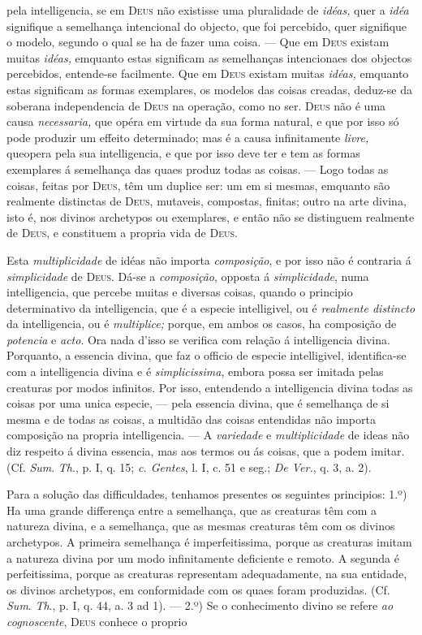 pela intelligencia, se em \textsc{Deus} não existisse uma pluralidade de \emph{idéas,} quer a \emph{idéa} signifique a semelhança intencional do objecto, que foi percebido, quer signifique o modelo, segundo o qual se ha de fazer uma coisa. --- Que em \textsc{Deus} existam muitas \emph{idéas,} emquanto estas significam as semelhanças intencionaes dos objectos percebidos, entende-se facilmente. Que em \textsc{Deus} existam muitas \emph{idéas,} emquanto estas significam as formas exemplares, os modelos das coisas creadas, deduz-se da soberana independencia de \textsc{Deus} na operação, como no ser. \textsc{Deus} não é uma causa \emph{necessaria,} que opéra em virtude da sua forma natural, e que por isso só pode produzir um effeito determinado; mas é a causa infinitamente \emph{livre,} queopera pela sua intelligencia, e que por isso deve ter e tem as formas exemplares á semelhança das quaes produz todas as coisas. --- Logo todas as coisas, feitas por \textsc{Deus}, têm um duplice ser: um em si mesmas, emquanto são realmente distinctas de \textsc{Deus}, mutaveis, compostas, finitas; outro na arte divina, isto é, nos divinos archetypos ou exemplares, e então não se distinguem realmente de \textsc{Deus}, e constituem a propria vida de \textsc{Deus}.\par Esta \emph{multiplicidade} de idéas não importa \emph{composição}, e por isso não é contraria á \emph{simplicidade} de \textsc{Deus}. Dá-se a \emph{composição}, opposta á \emph{simplicidade}, numa intelligencia, que percebe muitas e diversas coisas, quando o principio determinativo da intelligencia, que é a especie intelligivel, ou é \emph{realmente distincto} da intelligencia, ou é \emph{multiplice;} porque, em ambos os casos, ha composição de \emph{potencia} e \emph{acto}. Ora nada d'isso se verifica com relação á intelligencia divina. Porquanto, a essencia divina, que faz o officio de especie intelligivel, identifica-se com a intelligencia divina e é \emph{simplicissima}, embora possa ser imitada pelas creaturas por modos infinitos. Por isso, entendendo a intelligencia divina todas as coisas por uma unica especie, --- pela essencia divina, que é semelhança de si mesma e de todas as coisas, a multidão das coisas entendidas não importa composição na propria intelligencia. --- A \emph{variedade} e \emph{multiplicidade} de ideas não diz respeito á divina essencia, mas aos termos ou ás coisas, que a podem imitar. (Cf. \emph{Sum}. \emph{Th}., p. I, q. 15; \emph{c. Gentes}, l. I, c. 51 e seg.; \emph{De Ver.}, q. 3, a. 2).\par Para a solução das difficuldades, tenhamos presentes os seguintes principios: 1.º) Ha uma grande differença entre a semelhança, que as creaturas têm com a natureza divina, e a semelhança, que as mesmas creaturas têm com os divinos archetypos. A primeira semelhança é imperfeitissima, porque as creaturas imitam a natureza divina por um modo infinitamente deficiente e remoto. A segunda é perfeitissima, porque as creaturas representam adequadamente, na sua entidade, os divinos archetypos, em conformidade com os quaes foram produzidas. (Cf. \emph{Sum}. \emph{Th}., p. I, q. 44, a. 3 ad 1). --- 2.º) Se o conhecimento divino se refere \emph{ao cognoscente}, \textsc{Deus} conhece o proprio 